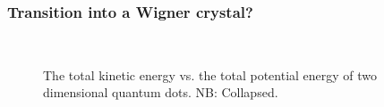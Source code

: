 % 
%  
%  

\begin{frame}
 \frametitle{Transition into a Wigner crystal?} 
 \captionsetup[subfloat]{labelformat=empty}
 \begin{figure}[h]
 \begin{center}
   \\
  \caption{The total kinetic energy vs. the total potential energy of two dimensional quantum dots. NB: Collapsed.}
  \label{fig:V_dist_qdots}
 \end{center}
\end{figure}
\captionsetup[subfloat]{labelformat=parens}
\end{frame}


